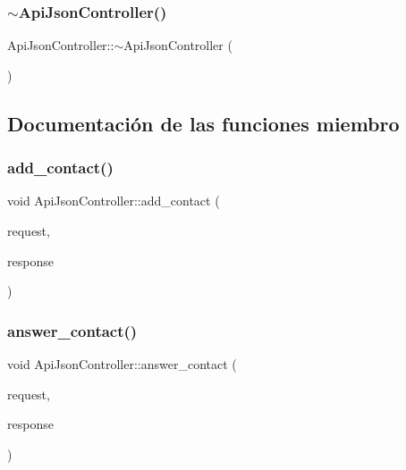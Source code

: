 \mbox{\label{classApiJsonController_a889add94a7d9a5a5e0cb4278fa81eb47}} 
\subsubsection{\texorpdfstring{$\sim$\+Api\+Json\+Controller()}{~ApiJsonController()}}
{\footnotesize\ttfamily Api\+Json\+Controller\+::$\sim$\+Api\+Json\+Controller (\begin{DoxyParamCaption}{ }\end{DoxyParamCaption})}



\subsection{Documentación de las funciones miembro}
\mbox{\label{classApiJsonController_ae4c1ff09c9e16db375ea371086b45e5b}} 
\subsubsection{\texorpdfstring{add\+\_\+contact()}{add\_contact()}}
{\footnotesize\ttfamily void Api\+Json\+Controller\+::add\+\_\+contact (\begin{DoxyParamCaption}\item[{Mongoose\+::\+Request \&}]{request,  }\item[{Mongoose\+::\+Json\+Response \&}]{response }\end{DoxyParamCaption})}

\mbox{\label{classApiJsonController_aa68f90e0aa81f847afbfb55764eac073}} 
\subsubsection{\texorpdfstring{answer\+\_\+contact()}{answer\_contact()}}
{\footnotesize\ttfamily void Api\+Json\+Controller\+::answer\+\_\+contact (\begin{DoxyParamCaption}\item[{Mongoose\+::\+Request \&}]{request,  }\item[{Mongoose\+::\+Json\+Response \&}]{response }\end{DoxyParamCaption})}


